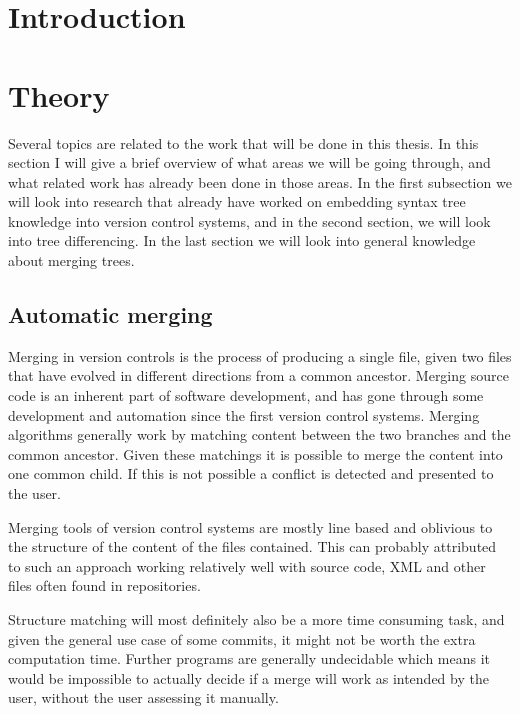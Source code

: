 \documentclass[11pt]{article}
\author{
        Kasper Videbæk \\
}
\date{\today}
\begin{document}
\maketitle

\tableofcontents

\clearpage 
\section{Introduction}

\clearpage 
\section{Theory}
Several topics are related to the work that will be done in this thesis. In this section I will give a brief overview of what areas we will be going through, and what related work has already been done in those areas. In the first subsection we will look into research that already have worked on embedding syntax tree knowledge into version control systems, and in the second section, we will look into tree differencing. In the last section we will look into general knowledge about merging trees.



\subsection{Automatic merging}
Merging in version controls is the process of producing a single file, given two files that have evolved in different directions from a common ancestor. Merging source code is an inherent part of software development, and has gone through some development and automation since the first version control systems. Merging algorithms generally work by matching content between the two branches and the common ancestor. Given these matchings it is possible to merge the content into one common child. If this is not possible a conflict is detected and presented to the user.

Merging tools of version control systems are mostly line based and oblivious to the structure of the content of the files contained. This can probably attributed to such an approach working relatively well with source code, XML and other files often found in repositories.

Structure matching will most definitely also be a more time consuming task, and given the general use case of some commits, it might not be worth the extra computation time. Further programs are generally undecidable which means it would be impossible to actually decide if a merge will work as intended by the user, without the user assessing it manually.
\end{document}
